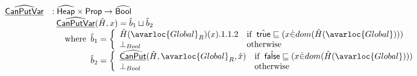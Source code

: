 \[\begin{array}{ll}
\ahf{CanPutVar} & : \aHeap \times \SF{Prop} \rightarrow \abs{Bool}\\
&
\begin{array}{ll}
\ahf{CanPutVar}(\hat{H},x)
  =  \hat{b}_1\sqcup\hat{b}_2\\
  \quad\wherec{
    \hat{b}_1 =
      \left\{
        \begin{array}{ll}
          \hat{H}(\avarloc{Global}_R)(x).1.1.2 & \ifc{\atrue\sqsubseteq(x \dot{\in} dom(\hat{H}(\avarloc{Global})))} \\
          \bot_{Bool} & \owc \\
        \end{array}
      \right.\\
    \hat{b}_2 = 
      \left\{
        \begin{array}{ll}
          \ahf{CanPut}(\hat{H},\avarloc{Global}_R,\hat{x}) & \ifc{\afalse\sqsubseteq(x \dot{\in} dom(\hat{H}(\avarloc{Global})))} \\
          \bot_{Bool} & \owc \\
        \end{array}
      \right.\\
  }
\end{array}\\
\\

\\




\end{array}\]
